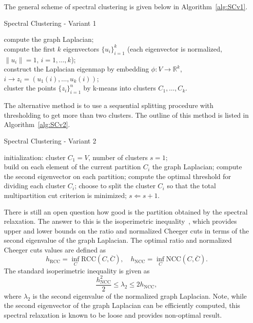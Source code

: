 The general scheme of spectral clustering is given below in Algorithm~\ref{alg:SCv1}.
\incmargin{1em}
\begin{algorithm}[hbtp]
\caption{Spectral Clustering - Variant 1}
\label{alg:SCv1}
\dontprintsemicolon
\BlankLine
\Indm  
{}
\Indp
\BlankLine
compute the graph Laplacian;\\
compute the first $k$ eigenvectors $\{ u_i \}_{i=1}^k$ (each eigenvector is normalized, $\lVert u_i\rVert=1$, $i=1,\dots,k$);\\
construct the Laplacian eigenmap by embedding $\phi: V\rightarrow \mathbb{R}^k$, $i\rightarrow z_i =(u_1(i),\dots,u_k(i))$;\\
cluster the points $\{z_i\}_{i=1}^n$ by k-means into clusters $C_1,\dots,C_k$.
\BlankLine
\Indm  
{} 
\end{algorithm}
\decmargin{1em}

The alternative method is to use a sequential splitting procedure with thresholding to get more than two clusters. The outline of this method is listed in Algorithm~\ref{alg:SCv2}.
\incmargin{1em}
\begin{algorithm} [hbtp]
\caption{Spectral Clustering - Variant 2}
\label{alg:SCv2}
\dontprintsemicolon
\BlankLine
\Indm  
{}
\Indp
\BlankLine
initialization: cluster $C_1 = V$, number of clusters $s=1$;\\
{}
{
build on each element of the current partition $C_i$ the graph Laplacian;\;
compute the second eigenvector on each partition;\;
compute the optimal threshold for dividing each cluster $C_i$;\;
choose to split the cluster $C_i$ so that the total multipartition cut criterion is minimized;\;
$s\Longleftarrow s+1$.
}
\BlankLine
\Indm  
{} 
\end{algorithm}
\decmargin{1em}

There is still an open question how good is the partition obtained by the spectral relaxation. The answer to this is the isoperimetric inequality~\cite{Chung:1997}, which provides upper and lower bounds on the ratio and normalized
Cheeger cuts in terms of the second eigenvalue of the graph Laplacian. The optimal ratio and normalized Cheeger cuts values are defined as
\begin{equation*}
h_{\mathrm{RCC}} = \inf_{C} \mathrm{RCC}(C,\overline{C}), \quad h_{\mathrm{NCC}} = \inf_{C} \mathrm{NCC}(C,\overline{C}).
\end{equation*}
The standard isoperimetric inequality is given as
\begin{equation}
 \frac{h_{\mathrm{NCC}}^2}{2} \leq \lambda_{2} \leq  2 h_{\mathrm{NCC}},
\end{equation}
where $\lambda_2$ is the second eigenvalue of the normalized graph Laplacian. Note, while the second eigenvector of the graph Laplacian can be efficiently computed, this spectral relaxation is known to be 
loose %
and provides non-optimal result.
